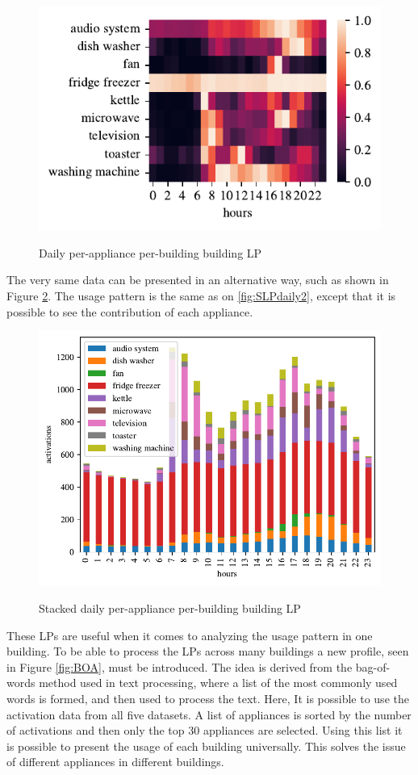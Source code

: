 \begin{figure}[H]
	\centering
	\caption{Daily per-appliance per-building building LP}
	\includegraphics[]{../Figures/LPS/PHPA_profile_for_building.pdf}
	\label{fig:PHPA}
\end{figure}

The very same data can be presented in an alternative way, such as shown in Figure \ref{fig:stack}.
The usage pattern is the same as on \ref{fig:SLPdaily2}, except that it is possible to see
the contribution of each appliance. 

\begin{figure}[H]
	\centering
	\caption{Stacked daily per-appliance per-building building LP}
	\includegraphics[width=.8\textwidth]{../Figures/LPS/stacked_LP.pdf}
	\label{fig:stack}
\end{figure}  
 
These LPs are useful when it comes to analyzing the usage pattern in one building.
To be able to process the LPs across many buildings a new profile, seen in Figure \ref{fig:BOA}, must be introduced.
The idea is derived from the bag-of-words method used in text processing, where a list of the most commonly used words is formed, and then used to process the text. 
Here, It is possible to use the activation data from all five datasets.
A list of appliances is sorted by the number of activations and then only the top 30 appliances are selected.
Using this list it is possible to present the usage of each building universally. This solves the issue of different appliances in different buildings.

